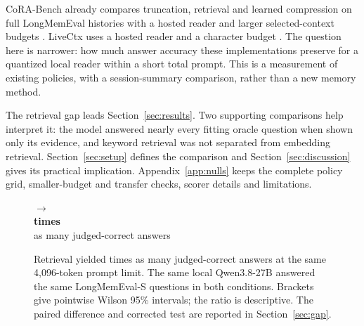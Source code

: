 \documentclass[11pt,letterpaper]{article}
\newcommand{\PfiveLargeBudget}{4,096}
\newcommand{\PfiveConfidence}{95}
\begin{document}
CoRA-Bench already compares truncation, retrieval and learned compression on
full LongMemEval histories with a hosted reader and larger selected-context
budgets \citep{pardawala2026cora}. LiveCtx uses a hosted reader and a character
budget \citep{liu2026livectx}. The question here is narrower: how much answer
accuracy these implementations preserve for a quantized local reader within a
short total prompt. This is a measurement of existing policies, with a
session-summary comparison, rather than a new memory method.

The retrieval gap leads Section~\ref{sec:results}. Two supporting comparisons
help interpret it: the model answered nearly every fitting oracle question
when shown only its evidence, and keyword retrieval was not separated from
embedding retrieval. Section~\ref{sec:setup} defines the comparison and
Section~\ref{sec:discussion} gives its practical implication. Appendix~\ref{app:nulls}
keeps the complete policy grid, smaller-budget and transfer checks, scorer
details and limitations.

\begin{figure}[htbp]
\centering
{}
\hfill
\begin{minipage}[c]{0.20\linewidth}\centering
{\Large $\longrightarrow$}\\[5pt]
\textbf{\PfiveRetrievalRatio{} times}\\
as many judged-correct answers
\end{minipage}
\hfill
{}
\caption{Retrieval yielded \PfiveRetrievalRatio{} times as many judged-correct
answers at the same \PfiveLargeBudget{}-token prompt limit. The same local
Qwen3.8-27B answered the same LongMemEval-S questions in both conditions.
Brackets give pointwise Wilson \PfiveConfidence\% intervals; the ratio is
descriptive. The paired difference and corrected test are reported in
Section~\ref{sec:gap}.}
\label{fig:p5-gap}
\end{figure}
\end{document}
